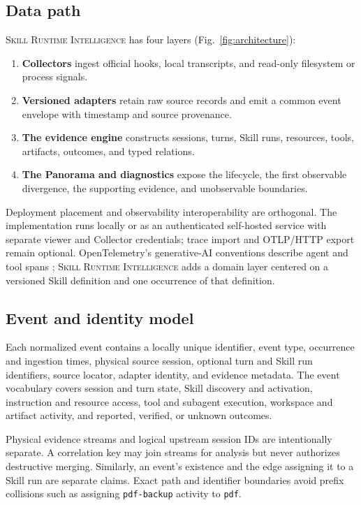 \documentclass[runningheads]{llncs}
\newcommand{\system}{\textsc{Skill Runtime Intelligence}\xspace}
\begin{document}
\subsection{Data path}

\system has four layers (Fig.~\ref{fig:architecture}):

\begin{enumerate}
  \item \textbf{Collectors} ingest official hooks, local transcripts, and
  read-only filesystem or process signals.
  \item \textbf{Versioned adapters} retain raw source records and emit a common
  event envelope with timestamp and source provenance.
  \item \textbf{The evidence engine} constructs sessions, turns, Skill runs,
  resources, tools, artifacts, outcomes, and typed relations.
  \item \textbf{The Panorama and diagnostics} expose the lifecycle, the first
  observable divergence, the supporting evidence, and unobservable boundaries.
\end{enumerate}

Deployment placement and observability interoperability are orthogonal. The
implementation runs locally or as an authenticated self-hosted service with
separate viewer and Collector credentials; trace import and OTLP/HTTP export
remain optional. OpenTelemetry's generative-AI conventions describe agent and
tool spans \cite{otel-genai}; \system adds a domain layer centered on a
versioned Skill definition and one occurrence of that definition.

\subsection{Event and identity model}

Each normalized event contains a locally unique identifier, event type,
occurrence and ingestion times, physical source session, optional turn and Skill
run identifiers, source locator, adapter identity, and evidence metadata.  The
event vocabulary covers session and turn state, Skill discovery and activation,
instruction and resource access, tool and subagent execution, workspace and
artifact activity, and reported, verified, or unknown outcomes.

Physical evidence streams and logical upstream session IDs are intentionally
separate.  A correlation key may join streams for analysis but never authorizes
destructive merging.  Similarly, an event's existence and the edge assigning it
to a Skill run are separate claims.  Exact path and identifier boundaries avoid
prefix collisions such as assigning \texttt{pdf-backup} activity to
\texttt{pdf}.
\end{document}
